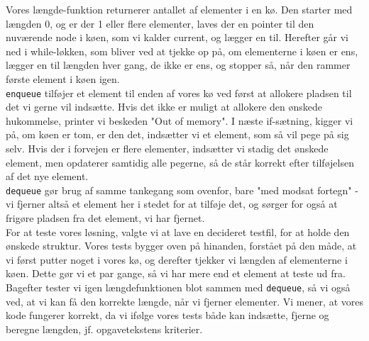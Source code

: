 Vores længde-funktion returnerer antallet af elementer i en kø. Den starter med længden 0, og er der 1 
eller flere elementer, laves der en pointer til den nuværende node i køen, som vi kalder current, og lægger 
en til. Herefter går vi ned i while-løkken, som bliver ved at tjekke op på, om elementerne i køen er ens, 
lægger en til længden hver gang, de ikke er ens, og stopper så, når den rammer første element i køen 
igen. \\

\noindent \verb+enqueue+ tilføjer et element til enden af vores kø ved først at allokere pladsen til det vi 
gerne vil indsætte. Hvis det ikke er muligt at allokere den ønskede hukommelse, printer vi beskeden "Out 
of memory". I næste if-sætning, kigger vi på, om køen er tom, er den det, indsætter vi et element, som så
vil pege på sig selv. Hvis der i forvejen er flere elementer, indsætter vi stadig det ønskede element, men 
opdaterer samtidig alle pegerne, så de står korrekt efter tilføjelsen af det nye element. \\

\noindent \verb+dequeue+ gør brug af samme tankegang som ovenfor, bare "med modsat fortegn" - vi 
fjerner altså et element her i stedet for at tilføje det, og sørger for også at frigøre pladsen fra det element, 
vi har fjernet.\\

\noindent For at teste vores løsning, valgte vi at lave en decideret testfil, for at holde den ønskede struktur.
Vores tests bygger oven på hinanden, forstået på den måde, at vi først putter noget i vores kø, og derefter
tjekker vi længden af elementerne i køen. Dette gør vi et par gange, så vi har mere end et element at 
teste ud fra. Bagefter tester vi igen længdefunktionen blot sammen med \verb+dequeue+, så vi også ved,
at vi kan få den korrekte længde, når vi fjerner elementer. Vi mener, at vores kode fungerer korrekt, da 
vi ifølge vores tests både kan indsætte, fjerne og beregne længden, jf. opgavetekstens kriterier. 